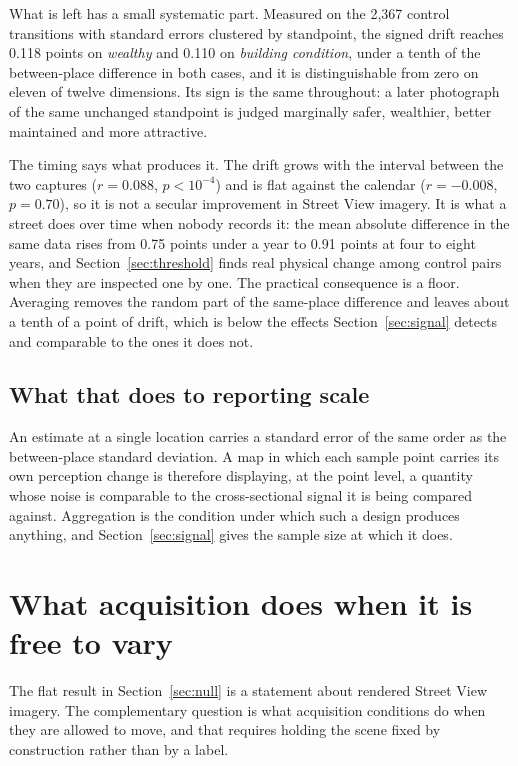 What is left has a small systematic part. Measured on the 2{,}367 control
transitions with standard errors clustered by standpoint, the signed drift
reaches 0.118 points on \emph{wealthy} and 0.110 on \emph{building condition},
under a tenth of the between-place difference in both cases, and it is
distinguishable from zero on eleven of twelve dimensions. Its sign is the same
throughout: a later photograph of the same unchanged standpoint is judged
marginally safer, wealthier, better maintained and more attractive.

The timing says what produces it. The drift grows with the interval between the
two captures ($r = 0.088$, $p < 10^{-4}$) and is flat against the calendar
($r = -0.008$, $p = 0.70$), so it is not a secular improvement in Street View
imagery. It is what a street does over time when nobody records it: the mean
absolute difference in the same data rises from 0.75 points under a year to 0.91
points at four to eight years, and Section~\ref{sec:threshold} finds real
physical change among control pairs when they are inspected one by one. The
practical consequence is a floor. Averaging removes the random part of the
same-place difference and leaves about a tenth of a point of drift, which is
below the effects Section~\ref{sec:signal} detects and comparable to the ones it
does not.

\subsection{What that does to reporting scale}

An estimate at a single location carries a standard error of the same order as
the between-place standard deviation. A map in which each sample point carries
its own perception change is therefore displaying, at the point level, a
quantity whose noise is comparable to the cross-sectional signal it is being
compared against. Aggregation is the condition under which such a design
produces anything, and Section~\ref{sec:signal} gives the sample size at which
it does.

\section{What acquisition does when it is free to vary}
\label{sec:probe}

The flat result in Section~\ref{sec:null} is a statement about rendered Street
View imagery. The complementary question is what acquisition conditions do when
they are allowed to move, and that requires holding the scene fixed by
construction rather than by a label.


